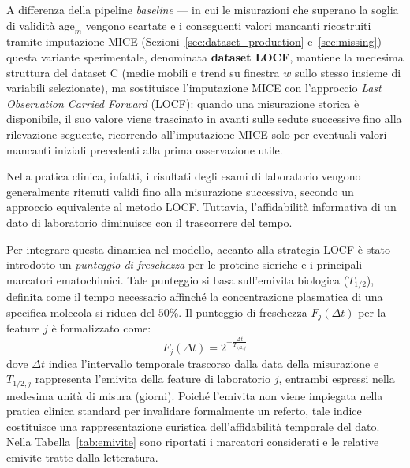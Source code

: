 \documentclass[a4paper,12pt]{report}
\begin{document}
A differenza della pipeline \textit{baseline} --- in cui le misurazioni che superano la soglia di validità \(\mathrm{age}_m\) vengono scartate e i conseguenti valori mancanti ricostruiti tramite imputazione MICE (Sezioni~\ref{sec:dataset_production} e~\ref{sec:missing}) --- questa variante sperimentale, denominata \textbf{dataset LOCF}, mantiene la medesima struttura del dataset C (medie mobili e trend su finestra \(w\) sullo stesso insieme di variabili selezionate), ma sostituisce l'imputazione MICE con l'approccio \textit{Last Observation Carried Forward} (LOCF): quando una misurazione storica è disponibile, il suo valore viene trascinato in avanti sulle sedute successive fino alla rilevazione seguente, ricorrendo all'imputazione MICE solo per eventuali valori mancanti iniziali precedenti alla prima osservazione utile.

Nella pratica clinica, infatti, i risultati degli esami di laboratorio vengono generalmente ritenuti validi fino alla misurazione successiva, secondo un approccio equivalente al metodo LOCF. Tuttavia, l'affidabilità informativa di un dato di laboratorio diminuisce con il trascorrere del tempo.

Per integrare questa dinamica nel modello, accanto alla strategia LOCF è stato introdotto un \textit{punteggio di freschezza} per le proteine sieriche e i principali marcatori ematochimici. Tale punteggio si basa sull'emivita biologica (\(T_{1/2}\)), definita come il tempo necessario affinché la concentrazione plasmatica di una specifica molecola si riduca del \(50\%\). Il punteggio di freschezza \(F_j(\Delta t)\) per la feature \(j\) è formalizzato come:
\[
F_j(\Delta t) = 2^{-\frac{\Delta t}{T_{1/2,j}}}
\]
dove \(\Delta t\) indica l'intervallo temporale trascorso dalla data della misurazione e \(T_{1/2,j}\) rappresenta l'emivita della feature di laboratorio \(j\), entrambi espressi nella medesima unità di misura (giorni). Poiché l'emivita non viene impiegata nella pratica clinica standard per invalidare formalmente un referto, tale indice costituisce una rappresentazione euristica dell'affidabilità temporale del dato. Nella Tabella~\ref{tab:emivite} sono riportati i marcatori considerati e le relative emivite tratte dalla letteratura.
\end{document}
